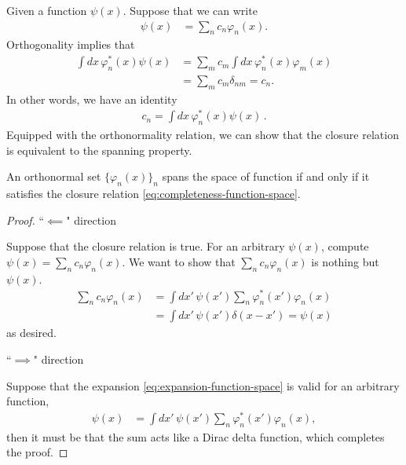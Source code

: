 Given a function $\psi(x)$. Suppose that we can write
\begin{align}\label{eq:expansion-function-space}
	\psi(x) &= \sum_n c_n \varphi_n(x).
\end{align}
Orthogonality implies that
\begin{align}
	\int dx\, \varphi_n^*(x)\psi(x) 
	&= \sum_m c_m \int dx\, \varphi^*_n(x)\varphi_m(x)  \\
	&= \sum_m c_m \delta_{nm} = c_n.
\end{align}
In other words, we have an identity
\begin{align}
	\boxed{c_n = \int dx\, \varphi_n^*(x)\psi(x) }\,.
\end{align}
Equipped with the orthonormality relation, we can show that the closure relation is equivalent to the spanning property.
\begin{lemma}\label{}
	An orthonormal set $\{\varphi_n(x)\}_n$ spans the space of function if and only if it satisfies the closure relation \eqref{eq:completeness-function-space}.
\end{lemma}
\begin{proof}
	``$\impliedby$" direction
	
	Suppose that the closure relation is true. For an arbitrary $\psi(x)$, compute $\psi(x) = \sum_n c_n \varphi_n(x)$. We want to show that $\sum_nc_n\varphi_n(x)$ is nothing but $\psi(x)$.
	\begin{align}
		\sum_nc_n\varphi_n(x) &= \int dx'\, \psi(x') \sum_n \varphi_n^*(x') \varphi_n(x) \\
		&= \int dx'\, \psi(x')\delta(x-x') = \psi(x)
	\end{align}
	as desired.
	
	``$\implies$" direction
	
	Suppose that the expansion \eqref{eq:expansion-function-space} is valid for an arbitrary function,
	\begin{align}
		\psi(x) &=  \int dx'\, \psi(x') \sum_n \varphi_n^*(x') \varphi_n(x),  
	\end{align}
	then it must be that the sum acts like a Dirac delta function, which completes the proof.
\end{proof}

